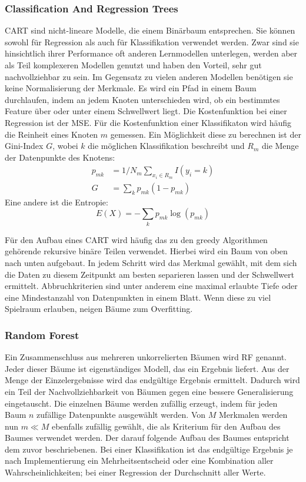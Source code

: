 	
		\subsubsection{Classification And Regression Trees}
		
		\ac{CART} sind nicht-lineare Modelle, die einem Binärbaum entsprechen. Sie können sowohl für Regression als auch für Klassifikation verwendet werden. Zwar sind sie hinsichtlich ihrer Performance oft anderen Lernmodellen unterlegen, werden aber als Teil komplexeren Modellen genutzt und haben den Vorteil, sehr gut nachvollziehbar zu sein. Im Gegensatz zu vielen anderen Modellen benötigen sie keine Normalisierung der Merkmale. Es wird ein Pfad in einem Baum durchlaufen, indem an jedem Knoten unterschieden wird, ob ein bestimmtes Feature über oder unter einem Schwellwert liegt. Die Kostenfunktion bei einer Regression ist der \ac{MSE}. Für die Kostenfunktion einer Klassifikaton wird häufig die \glqq{}Reinheit\grqq{} eines Knoten $m$ gemessen. Ein Möglichkeit diese zu berechnen ist der Gini-Index $G$, wobei $k$ die möglichen Klassifikation beschreibt und $R_m$ die Menge der Datenpunkte des Knotens: %
		\begin{align*}
			p_{mk} &= 1/ N_m \sum_{x_i \in R_m} I(y_i = k)\\
			G &= \sum_k p_{mk} (1 - p_{mk})
		\end{align*}
		Eine andere ist die Entropie:
		\[
			E(X) = - \sum_k p_{mk} \log(p_{mk}) 
		\]
		
		Für den Aufbau eines \ac{CART} wird häufig das zu den greedy Algorithmen gehörende rekursive binäre Teilen verwendet. Hierbei wird ein Baum von oben nach unten aufgebaut. In jedem Schritt wird das Merkmal gewählt, mit dem sich die Daten zu diesem Zeitpunkt am besten separieren lassen und der Schwellwert ermittelt. Abbruchkriterien sind unter anderem eine maximal erlaubte Tiefe oder eine Mindestanzahl von Datenpunkten in einem Blatt. Wenn diese zu viel Spielraum erlauben, neigen Bäume zum Overfitting.
		
		\subsubsection{Random Forest}
		
		Ein Zusammenschluss aus mehreren unkorrelierten Bäumen wird \ac{RF} genannt. Jeder dieser Bäume ist eigenständiges Modell, das ein Ergebnis liefert. Aus der Menge der Einzelergebnisse wird das endgültige Ergebnis ermittelt. Dadurch wird ein Teil der Nachvollziehbarkeit von Bäumen gegen eine bessere Generalisierung eingetauscht. Die einzelnen Bäume werden zufällig erzeugt, indem für jeden Baum $n$ zufällige Datenpunkte ausgewählt werden. Von $M$ Merkmalen werden nun $m \ll M$ ebenfalls zufällig gewählt, die als Kriterium für den Aufbau des Baumes verwendet werden. Der darauf folgende Aufbau des Baumes entspricht dem zuvor beschriebenen. Bei einer Klassifikation ist das endgültige Ergebnis je nach Implementierung ein Mehrheitsentscheid oder eine Kombination aller Wahrscheinlichkeiten; bei einer Regression der Durchschnitt aller Werte.
		
